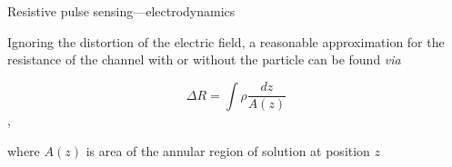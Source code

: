 
\begin{frame}[c]{Resistive pulse sensing---electrodynamics}
 
	Ignoring the distortion of the electric field, a reasonable approximation for the resistance of the channel with or without the particle can be found \textit{via}
		
	\[ \Delta R=\int\rho\frac{dz}{A\left(z\right)} \],
		
	where $A\left(z\right)$ is area of the annular region of solution at position $z$

\end{frame}



